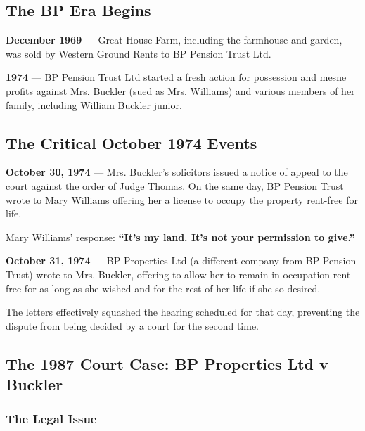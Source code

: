 \documentclass[11pt,a4paper]{article}
\begin{document}
\subsection{The BP Era Begins}

\begin{timeline}
\textbf{December 1969} --- Great House Farm, including the farmhouse and garden, was sold by Western Ground Rents to BP Pension Trust Ltd.
\end{timeline}

\begin{timeline}
\textbf{1974} --- BP Pension Trust Ltd started a fresh action for possession and mesne profits against Mrs. Buckler (sued as Mrs. Williams) and various members of her family, including William Buckler junior.
\end{timeline}

\subsection{The Critical October 1974 Events}

\begin{keyfact}
\textbf{October 30, 1974} --- Mrs. Buckler's solicitors issued a notice of appeal to the court against the order of Judge Thomas. On the same day, BP Pension Trust wrote to Mary Williams offering her a license to occupy the property rent-free for life.

Mary Williams' response: \textbf{``It's my land. It's not your permission to give.''}
\end{keyfact}

\begin{timeline}
\textbf{October 31, 1974} --- BP Properties Ltd (a different company from BP Pension Trust) wrote to Mrs. Buckler, offering to allow her to remain in occupation rent-free for as long as she wished and for the rest of her life if she so desired.
\end{timeline}

The letters effectively squashed the hearing scheduled for that day, preventing the dispute from being decided by a court for the second time.

\subsection{The 1987 Court Case: BP Properties Ltd v Buckler}

\subsubsection{The Legal Issue}
\end{document}
